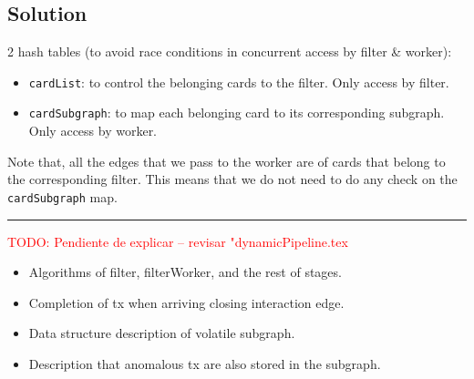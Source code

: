 \subsection{Solution}

2 hash tables (to avoid race conditions in concurrent access by filter \& worker):
\begin{itemize}
  \item \texttt{cardList}: to control the belonging cards to the filter. Only access by filter.
  \item \texttt{cardSubgraph}: to map each belonging card to its corresponding subgraph. Only access by worker.
\end{itemize}

Note that, all the edges that we pass to the worker are of cards that belong to the corresponding filter. This means that we do not need to do any check on the \texttt{cardSubgraph} map.

\textcolor{red}{\rule{\linewidth}{0.5mm}}
\textcolor{red}{TODO: Pendiente de explicar -- revisar "dynamicPipeline.tex}

\begin{itemize}
    \item Algorithms of filter, filterWorker, and the rest of stages.
    \item Completion of tx when arriving closing interaction edge.
    \item Data structure description of volatile subgraph.
    \item Description that anomalous tx are also stored in the subgraph.
\end{itemize}

